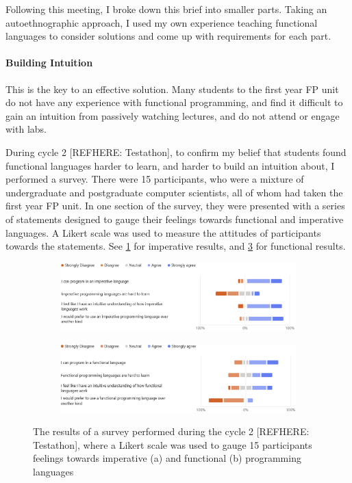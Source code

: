 Following this meeting, I broke down this brief into smaller parts. Taking an autoethnographic approach, I used my own experience teaching functional languages to consider solutions and come up with requirements for each part. 

\paragraph{Building Intuition} This is the key to an effective solution. Many students to the first year FP unit do not have any experience with functional programming, and find it difficult to gain an intuition from passively watching lectures, and do not attend or engage with labs. 

During cycle 2 [REFHERE: Testathon], to confirm my belief that students found functional languages harder to learn, and harder to build an intuition about, I performed a survey. There were 15 participants, who were a mixture of undergraduate and postgraduate computer scientists, all of whom had taken the first year FP unit. In one section of the survey, they were presented with a series of statements designed to gauge their feelings towards functional and imperative languages. A Likert scale\cite{likert1932technique} was used to measure the attitudes of participants towards the statements. See \ref{fig:imp_is_easy} for imperative results, and \ref{fig:fp_is_hard} for functional results. 

\begin{figure}[ht]
    \begin{subfigure}{\textwidth}
        \centering
        \includegraphics[width=\linewidth]{images/imperative_likert.png}
        \caption{}
        \label{fig:imp_is_easy}
    \end{subfigure}
    
    \begin{subfigure}{\textwidth}
        \centering
        \includegraphics[width=\linewidth]{images/fp_likert.png}
        \caption{}
        \label{fig:fp_is_hard}
    \end{subfigure}
    \caption{The results of a survey performed during the cycle 2 [REFHERE: Testathon], where a Likert scale was used to gauge 15 participants feelings towards imperative (a) and functional (b) programming languages}
\end{figure}
  
